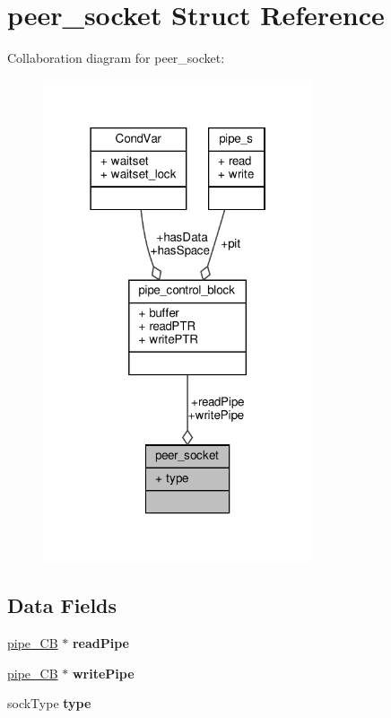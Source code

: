 \hypertarget{structpeer__socket}{}\section{peer\+\_\+socket Struct Reference}
\label{structpeer__socket}


Collaboration diagram for peer\+\_\+socket\+:
\nopagebreak
\begin{figure}[H]
\begin{center}
\leavevmode
\includegraphics[width=226pt]{structpeer__socket__coll__graph}
\end{center}
\end{figure}
\subsection*{Data Fields}
\begin{DoxyCompactItemize}
\item 
\mbox{\label{structpeer__socket_aa0f2babc5bc72322fbeece7791f05a90}} 
\hyperlink{structpipe__control__block}{pipe\+\_\+\+CB} $\ast$ {\bfseries read\+Pipe}
\item 
\mbox{\label{structpeer__socket_a6991cffe1867c851b4a5cf8dbf56f488}} 
\hyperlink{structpipe__control__block}{pipe\+\_\+\+CB} $\ast$ {\bfseries write\+Pipe}
\item 
\mbox{\label{structpeer__socket_a9174fc7e03084291d0bde6e5f7efef94}} 
sock\+Type {\bfseries type}
\end{DoxyCompactItemize}



